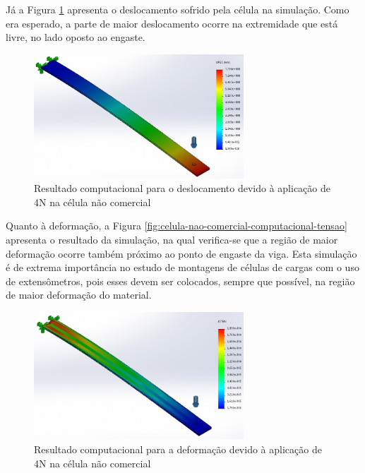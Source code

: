 \documentclass[a4paper]{instrumentacao}
\begin{document}
Já a Figura \ref{fig:celula-nao-comercial-computacional-deslocamento} apresenta o deslocamento sofrido pela célula na simulação. Como era esperado, a parte de maior deslocamento ocorre na extremidade que está livre, no lado oposto ao engaste.

\begin{figure}[H]
\center
\includegraphics[width=0.7\textwidth]{CelulaNaoComercial_solid_deslocamento.jpg}
\caption{Resultado computacional para o deslocamento devido à aplicação de 4N na célula não comercial}
\label{fig:celula-nao-comercial-computacional-deslocamento}
\end{figure}

Quanto à deformação, a Figura \ref{fig:celula-nao-comercial-computacional-tensao} apresenta o resultado da simulação, na qual verifica-se que a região de maior deformação ocorre também próximo ao ponto de engaste da viga. Esta simulação é de extrema importância no estudo de montagens de células de cargas com o uso de extensômetros, pois esses devem ser colocados, sempre que possível, na região de maior deformação do material.

\begin{figure}[H]
\center
\includegraphics[width=0.7\textwidth]{CelulaNaoComercial_solid_deformacao.jpg}
\caption{Resultado computacional para a deformação devido à aplicação de 4N na célula não comercial}
\label{fig:celula-nao-comercial-computacional-deformacao}
\end{figure}
\end{document}
